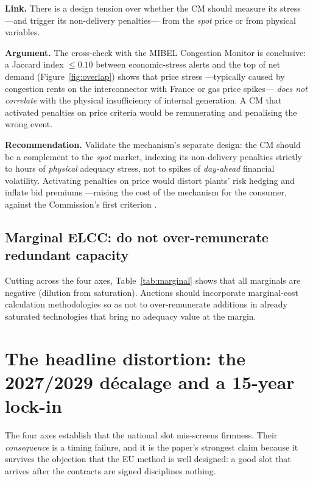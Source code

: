 \documentclass[11pt,a4paper]{article}
\begin{document}
\textbf{Link.} There is a design tension over whether the CM should measure its
stress ---and trigger its non-delivery penalties--- from the \emph{spot} price or
from physical variables.

\textbf{Argument.} The cross-check with the MIBEL Congestion Monitor is
conclusive: a Jaccard index $\leq 0.10$ between economic-stress alerts and the top
of net demand (Figure~\ref{fig:overlap}) shows that price stress ---typically
caused by congestion rents on the interconnector with France or gas price spikes---
\emph{does not correlate} with the physical insufficiency of internal generation. A
CM that activated penalties on price criteria would be remunerating and penalising
the wrong event.

\textbf{Recommendation.} Validate the mechanism's separate design: the CM should
be a complement to the \emph{spot} market, indexing its non-delivery penalties
strictly to hours of \emph{physical} adequacy stress, not to spikes of
\emph{day-ahead} financial volatility. Activating penalties on price would distort
plants' risk hedging and inflate bid premiums ---raising the cost of the mechanism
for the consumer, against the Commission's first criterion
\citep{ec2026sa112483}.

\subsection{Marginal ELCC: do not over-remunerate redundant capacity}

Cutting across the four axes, Table~\ref{tab:marginal} shows that all marginals are
negative (dilution from saturation). Auctions should incorporate marginal-cost
calculation methodologies so as not to over-remunerate additions in already
saturated technologies that bring no adequacy value at the margin.

\section{The headline distortion: the 2027/2029 d\'ecalage and a 15-year lock-in}
\label{sec:decalage}

The four axes establish that the national slot mis-screens firmness. Their
\emph{consequence} is a timing failure, and it is the paper's strongest claim because
it survives the objection that the EU method is well designed: a good slot that
arrives after the contracts are signed disciplines nothing.
\end{document}
